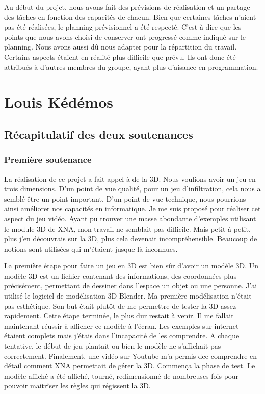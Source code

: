 \documentclass[12pt]{article}
\begin{document}
Au début du projet, nous avons fait des prévisions de réalisation et un partage des tâches en fonction des capacités de chacun. Bien que certaines tâches n'aient pas été réalisées, le planning prévisionnel a été respecté. C'est à dire que les points que nous avons choisi de conserver ont progressé comme indiqué sur le planning. Nous avons aussi dû nous adapter pour la répartition du travail. Certains aspects étaient en réalité plus difficile que prévu. Ils ont donc été attribués à d'autres membres du groupe, ayant plus d'aisance en programmation. 
\newpage

\section{Louis Kédémos}

\subsection{Récapitulatif des deux soutenances}

\subsubsection{Première soutenance}

La réalisation de ce projet a fait appel à de la 3D. Nous voulions avoir un jeu en trois dimensions. D'un point de vue qualité, pour un jeu d'infiltration, cela nous a semblé être un point important. D'un point de vue technique, nous pourrions ainsi améliorer nos capacités en informatique. Je me suis proposé pour réaliser cet aspect du jeu vidéo. Ayant pu trouver une masse abondante d'exemples utilisant le module 3D de XNA, mon travail ne semblait pas difficile. Mais petit à petit, plus j'en découvrais sur la 3D, plus cela devenait incompréhensible. Beaucoup de notions sont utilisées qui m'étaient jusque là inconnues. 

La première étape pour faire un jeu en 3D est bien sûr d'avoir un modèle 3D. Un modèle 3D est un fichier contenant des informations, des coordonnées plus précisément, permettant de dessiner dans l'espace un objet ou une personne. J'ai utilisé le logiciel de modélisation 3D Blender. Ma première modélisation n'était pas esthétique. Son but était plutôt de me permettre de tester la 3D assez rapidement. Cette étape terminée, le plus dur restait à venir. Il me fallait maintenant réussir à afficher ce modèle à l'écran. Les exemples sur internet étaient complets mais j'étais dans l'incapacité de les comprendre. A chaque tentative, le début de jeu plantait ou bien le modèle ne s'affichait pas correctement. Finalement, une vidéo sur Youtube m'a permis dee comprendre en détail comment XNA permettait de gérer la 3D. Commença la phase de test. Le modèle affiché a été affiché, tourné, redimensionné de nombreuses fois pour pouvoir maitrîser les règles qui régissent la 3D. 
\end{document}
